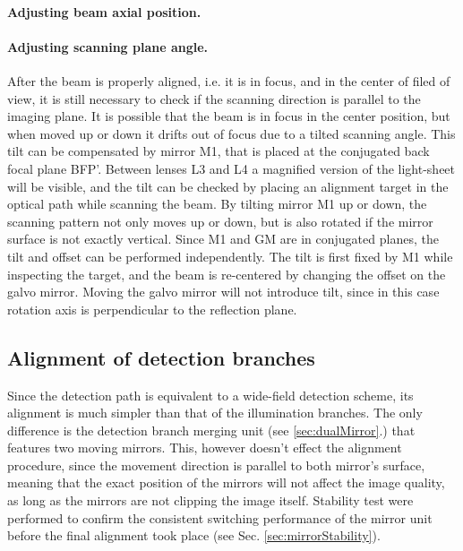     \paragraph{Adjusting beam axial position.}


    \paragraph{Adjusting scanning plane angle.}
      After the beam is properly aligned, i.e. it is in focus, and in the center of filed of view, it is still necessary to check if the scanning direction is parallel to the imaging plane. It is possible that the beam is in focus in the center position, but when moved up or down it drifts out of focus due to a tilted scanning angle. This tilt can be compensated by mirror M1, that is placed at the conjugated back focal plane BFP'. Between lenses L3 and L4 a magnified version of the light-sheet will be visible, and the tilt can be checked by placing an alignment target in the optical path while scanning the beam. By tilting mirror M1 up or down, the scanning pattern not only moves up or down, but is also rotated if the mirror surface is not exactly vertical. Since M1 and GM are in conjugated planes, the tilt and offset can be performed independently. The tilt is first fixed by M1 while inspecting the target, and the beam is re-centered by changing the offset on the galvo mirror. Moving the galvo mirror will not introduce tilt, since in this case rotation axis is perpendicular to the reflection plane.




  \subsection{Alignment of detection branches}
    Since the detection path is equivalent to a wide-field detection scheme, its alignment is much simpler than that of the illumination branches. The only difference is the detection branch merging unit (see \autoref{sec:dualMirror}.) that features two moving mirrors. This, however doesn't effect the alignment procedure, since the movement direction is parallel to both mirror's surface, meaning that the exact position of the mirrors will not affect the image quality, as long as the mirrors are not clipping the image itself. Stability test were performed to confirm the consistent switching performance of the mirror unit before the final alignment took place (see Sec. \ref{sec:mirrorStability}).

